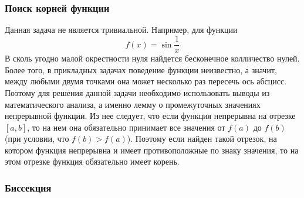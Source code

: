 \chapter{}
\subsection*{Поиск корней функции}

Данная задача не является тривиальной. Например, для функции
\[f(x) = \sin{\frac{1}{x}}\]
В сколь угодно малой окрестности нуля найдется бесконечное колличество нулей. Более того, в прикладных задачах поведение функции неизвестно, а значит, между любыми двумя точками она может несколько раз пересечь ось абсцисс. Поэтому для решения данной задачи необходимо использовать выводы из математического анализа, а именно лемму о промежуточных значениях непрерывной функции. Из нее следует, что если функция непрерывна на отрезке $[a, b]$, то на нем она обязательно принимает все значения от $f(a)$ до $f(b)$ (при условии, что $f(b) > f(a)$). Поэтому если найден такой отрезок, на котором функция непрерывна и имеет противоположные по знаку значения, то на этом отрезке функция обязательно имеет корень.

\subsection*{Биссекция}

